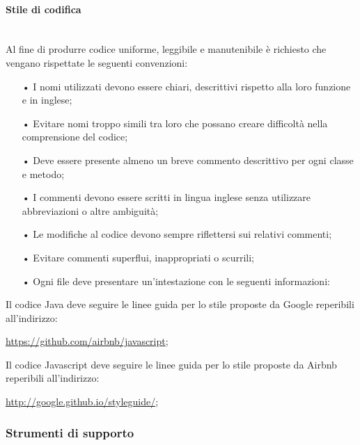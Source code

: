 \paragraph{Stile di codifica}\mbox{}\\
Al fine di produrre codice uniforme, leggibile e manutenibile è richiesto che vengano rispettate
le seguenti convenzioni:
\begin{itemize}
\item[•] I nomi utilizzati devono essere chiari, descrittivi rispetto alla loro funzione e in inglese;
\item[•] Evitare nomi troppo simili tra loro che possano creare difficoltà nella comprensione del codice;
\item[•] Deve essere presente almeno un breve commento descrittivo per ogni classe e metodo;
\item[•] I commenti devono essere scritti in lingua inglese senza utilizzare abbreviazioni o altre ambiguità;
\item[•] Le modifiche al codice devono sempre riflettersi sui relativi commenti;
\item[•] Evitare commenti superflui, inappropriati o scurrili;
\item[•] Ogni file deve presentare un’intestazione con le seguenti informazioni:
\end{itemize}
Il codice Java deve seguire le linee guida per lo stile proposte da Google reperibili all'indirizzo:
\begin{center}
\url{https://github.com/airbnb/javascript};
\end{center}
Il codice Javascript deve seguire le linee guida per lo stile proposte da Airbnb reperibili all'indirizzo:
\begin{center}
	\url{http://google.github.io/styleguide/};
\end{center}


\subsubsection{Strumenti di supporto}
